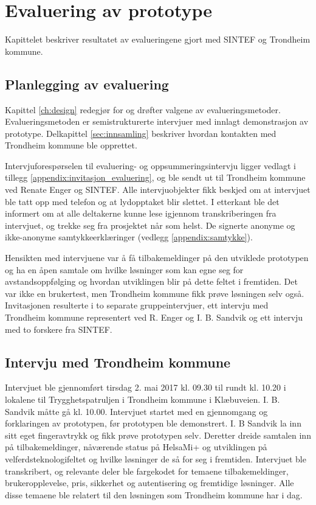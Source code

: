 \chapter{Evaluering av prototype}
\label{ch:evaluation1}
Kapittelet beskriver resultatet av evalueringene gjort med SINTEF og Trondheim kommune.

\section{Planlegging av evaluering}
Kapittel \ref{ch:design} redegjør for og drøfter valgene av evalueringsmetoder.
Evalueringsmetoden er semistrukturerte intervjuer med innlagt demonstrasjon av prototype. Delkapittel \ref{sec:innsamling}
beskriver hvordan kontakten med Trondheim kommune ble opprettet.

Intervjuforespørselen til evaluering- og oppsummeringsintervju ligger vedlagt i tillegg \ref{appendix:invitasjon_evaluering},
og ble sendt ut til Trondheim kommune ved Renate Enger og SINTEF. Alle intervjuobjekter fikk beskjed
om at intervjuet ble tatt opp med telefon og at lydopptaket blir slettet. I etterkant ble det informert om at alle deltakerne
kunne lese igjennom transkriberingen fra intervjuet, og trekke seg fra prosjektet når som helst. De signerte anonyme og ikke-anonyme
samtykkeerklæringer (vedlegg \ref{appendix:samtykke}).

Hensikten med intervjuene var å få tilbakemeldinger
på den utviklede prototypen og ha en åpen samtale om hvilke løsninger som kan egne seg for avstandsoppfølging og hvordan utviklingen blir
på dette feltet i fremtiden. Det var ikke en brukertest, men Trondheim kommune fikk prøve løsningen selv også.
Invitasjonen resulterte i to separate gruppeintervjuer, ett intervju med Trondheim kommune representert ved
R. Enger og I. B. Sandvik og ett intervju med to forskere fra SINTEF.

\section{Intervju med Trondheim
kommune}\label{intervju-med-trondheim-kommune}
Intervjuet ble gjennomført tirsdag 2. mai 2017 kl. 09.30 til rundt kl. 10.20 i lokalene til Trygghetspatruljen i Trondheim kommune
i Klæbuveien. I. B. Sandvik måtte gå kl. 10.00. Intervjuet startet med en gjennomgang og forklaringen av prototypen, før prototypen
ble demonstrert. I. B Sandvik la inn sitt eget fingeravtrykk og fikk prøve prototypen selv. Deretter dreide samtalen inn på tilbakemeldinger,
nåværende status på HelsaMi+ og utviklingen på velferdsteknologifeltet og hvilke løsninger de så for seg i fremtiden. Intervjuet ble transkribert,
og relevante deler ble fargekodet for temaene tilbakemeldinger, brukeropplevelse, pris, sikkerhet og autentisering og fremtidige løsninger.
Alle disse temaene ble relatert til den løsningen som Trondheim kommune har i dag.


